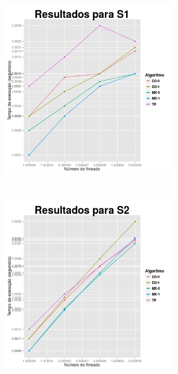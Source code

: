 \documentclass[10pt,a4paper,oneside]{article}
\begin{document}
\begin{figure}[t]
    \centering
    \begin{subfigure}[b]{0.45\textwidth}
      \centering
      \includegraphics[width=\textwidth]{S1.png}
    \end{subfigure}
    ~
    \begin{subfigure}[b]{0.45\textwidth}
      \centering
      \includegraphics[width=\textwidth]{S2.png}
    \end{subfigure}


\end{figure}
\end{document}
